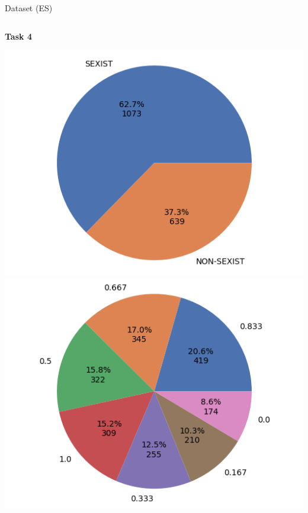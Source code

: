 \begin{frame}{Dataset (ES)}
    \begin{columns}[T]
        \begin{column}{0.3\textwidth}
            \centering
            \textbf{Task 4}

            \includegraphics[height=0.4\textheight, width=\textwidth, keepaspectratio]{images/t4_es_hard_presentacion.png}%
            \vfill
            \includegraphics[height=0.4\textheight, width=\textwidth, keepaspectratio]{images/t4_es_soft_presentacion.png}%
        \end{column}


\end{columns}
\end{frame}
